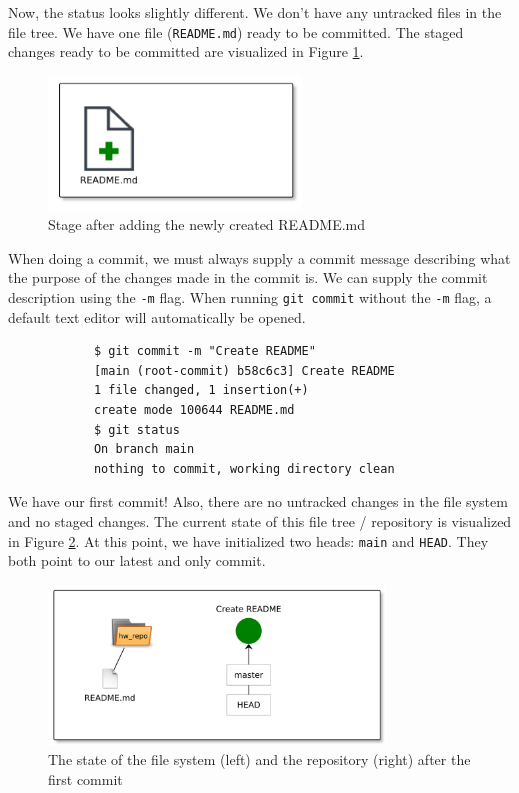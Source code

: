 \documentclass[../main/git_course_main.tex]{subfiles}
\begin{document}
	Now, the status looks slightly different. We don't have any untracked files in the file tree. We have one file (\verb$README.md$) ready to be committed. The staged changes ready to be committed are visualized in Figure \ref{fig:first_stage}.
	
	\begin{figure}[h!]
		\centering
		\includegraphics[width=0.6\textwidth
		]{../visualizations/chapter2/241_stage_created_readme.pdf}
		\caption{Stage after adding the newly created README.md}
		\label{fig:first_stage}
	\end{figure}
	
	When doing a commit, we must always supply a commit message describing what the purpose of the changes made in the
	commit is. We can supply the commit description using the \verb$-m$ flag. 
	When running \verb$git commit$ without the \verb$-m$ flag, a default text editor will automatically be opened.
	
	\begin{codebox}
		\begin{lstlisting}
			$ git commit -m "Create README"
			[main (root-commit) b58c6c3] Create README
			1 file changed, 1 insertion(+)
			create mode 100644 README.md
			$ git status
			On branch main
			nothing to commit, working directory clean
		\end{lstlisting}
	\end{codebox}
	
	We have our first commit! Also, there are no untracked changes in the file system and no staged changes.
	The current state of this file tree / repository is visualized in Figure \ref{fig:first_commit}. At this point, we have initialized two heads: \verb$main$ and \verb$HEAD$. They both point to our latest and only commit.
	
	\begin{figure}[h]
		\centering
		\includegraphics[width=0.8\textwidth]{../visualizations/chapter2/c24_repo_first_commit.pdf}
		\caption{The state of the file system (left) and the repository (right) after the first commit}
		\label{fig:first_commit}
	\end{figure}
	
\end{document}

